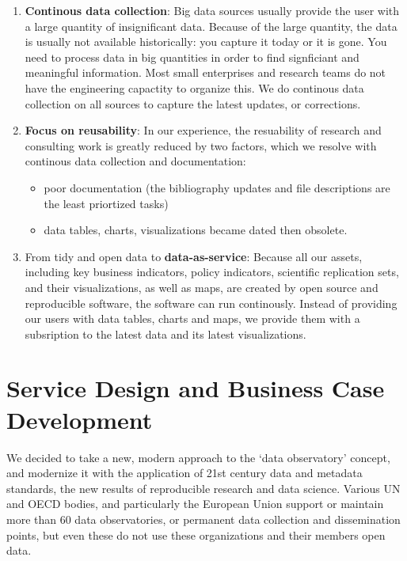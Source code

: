 \documentclass[
  a4paper,
  openany, a4paper, oneside]{book}
\providecommand{\tightlist}{%
  \setlength{\itemsep}{0pt}\setlength{\parskip}{0pt}}
\begin{document}
\begin{enumerate}
\def\labelenumi{\arabic{enumi}.}
\item
  \textbf{Continous data collection}: Big data sources usually provide the user with a large quantity of insignificant data. Because of the large quantity, the data is usually not available historically: you capture it today or it is gone. You need to process data in big quantities in order to find signficiant and meaningful information. Most small enterprises and research teams do not have the engineering capactity to organize this. We do continous data collection on all sources to capture the latest updates, or corrections.
\item
  \textbf{Focus on reusability}: In our experience, the resuability of research and consulting work is greatly reduced by two factors, which we resolve with continous data collection and documentation:

  \begin{itemize}
  \tightlist
  \item
    poor documentation (the bibliography updates and file descriptions are the least priortized tasks)
  \item
    data tables, charts, visualizations became dated then obsolete.
  \end{itemize}
\item
  From tidy and open data to \textbf{data-as-service}: Because all our assets, including key business indicators, policy indicators, scientific replication sets, and their visualizations, as well as maps, are created by open source and reproducible software, the software can run continously. Instead of providing our users with data tables, charts and maps, we provide them with a subsription to the latest data and its latest visualizations.
\end{enumerate}

\hypertarget{service}{%
\chapter{Service Design and Business Case Development}\label{service}}

We decided to take a new, modern approach to the `data observatory' concept, and modernize it with the application of 21st century data and metadata standards, the new results of reproducible research and data science. Various UN and OECD bodies, and particularly the European Union support or maintain more than 60 data observatories, or permanent data collection and dissemination points, but even these do not use these organizations and their members open data.
\end{document}
